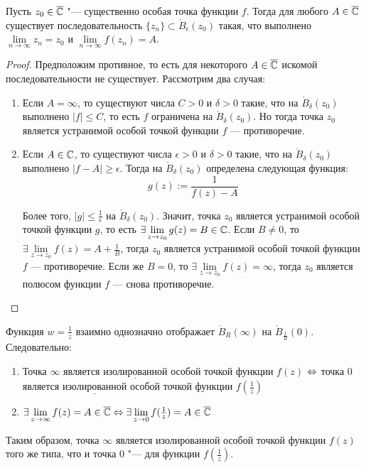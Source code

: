 \begin{theorem}[Сохоцкого]
	Пусть $z_0 \in \overline{\mathbb{C}}$ "--- существенно особая точка функции $f$. Тогда для любого $A \in \overline{\mathbb{C}}$ существует последовательность $\{z_n\} \subset \mathring B_\epsilon(z_0)$ такая, что выполнено $\lim\limits_{n \to \infty}z_n = z_0$ и $\lim\limits_{n \to \infty}f(z_n) = A$.
\end{theorem}

\begin{proof}
	Предположим противное, то есть для некоторого $A \in \overline{\mathbb{C}}$ искомой последовательности не существует. Рассмотрим два случая:
	\begin{enumerate}
		\item Если $A = \infty$, то существуют числа $C > 0$ и $\delta > 0$ такие, что на $\mathring B_\delta(z_0)$ выполнено $|f| \le C$, то есть $f$ ограничена на $\mathring B_\delta(z_0)$. Но тогда точка $z_0$ является устранимой особой точкой функции $f$ --- противоречие.
		
		\item Если $A \in \mathbb{C}$, то существуют числа $\epsilon > 0$ и $\delta > 0$ такие, что на $\mathring B_\delta(z_0)$ выполнено $|f - A| \ge \epsilon$. Тогда на $\mathring B_\delta(z_0)$ определена следующая функция:
		\[g(z) := \frac{1}{f(z) - A}\]
		
		Более того, $|g| \le \frac1\epsilon$ на $\mathring B_\delta(z_0)$. Значит, точка $z_0$ является устранимой особой точкой функции $g$, то есть $\exists \lim\limits_{z \to z_0} g(z) = B \in \mathbb{C}$. Если $B \ne 0$, то $\exists \lim\limits_{z \to z_0} f(z) = A + \frac1B$, тогда $z_0$ является устранимой особой точкой функции $f$ --- противоречие. Если же $B = 0$, то $\exists \lim\limits_{z \to z_0} f(z) = \infty$, тогда $z_0$ является полюсом функции $f$ --- снова противоречие.\qedhere
	\end{enumerate}
\end{proof}

\begin{note}
	Функция $w = \frac1z$ взаимно однозначно отображает $\mathring B_R(\infty)$ на $\mathring B_{\frac1R}(0)$. Следовательно:
	\begin{enumerate}
		\item Точка $\infty$ является \(\underline{\text{изолированной}}\) особой точкой функции $f(z)$ $\Leftrightarrow$ точка $0$ является \(\underline{\text{изолированной}}\) особой точкой функции $f(\frac1z)$
		\item $\exists \lim\limits_{z \to \infty}f(z) = A \in \overline{\mathbb{C}} \Leftrightarrow \exists \lim\limits_{z \to 0}f(\frac1z) = A \in \overline{\mathbb{C}}$
	\end{enumerate}
	
	Таким образом, точка $\infty$ является изолированной особой точкой функции $f(z)$ того же типа, что и точка $0$ "--- для функции $f(\frac1z)$.
\end{note}


